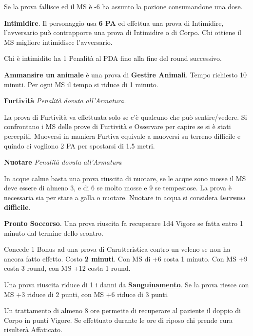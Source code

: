 \documentclass[12pt,a4paper,twoside,openany]{book}
\begin{document}
\begin{multicols}{2}
Se la prova fallisce ed il MS è -6 ha assunto la pozione consumandone una dose.

\medskip

\textbf{Intimidire}. Il personaggio usa \textbf{6 PA} ed effettua una prova di Intimidire, l'avversario può contrapporre una prova di Intimidire o di Corpo. Chi ottiene il MS migliore intimidisce l'avversario.

Chi è intimidito ha 1 Penalità al PDA fino alla fine del round successivo.

\medskip

\textbf{Ammansire un animale} è una prova di \textbf{Gestire Animali}. Tempo richiesto 10 minuti. Per ogni MS il tempo si riduce di 1 minuto.

\medskip

\textbf{Furtività}  \textit{Penalità dovuta all'Armatura.}

La prova di Furtività va effettuata solo se c'è qualcuno che può sentire/vedere. Si confrontano i MS delle prove di Furtività e Osservare per capire se si è stati percepiti. Muoversi in maniera Furtiva equivale a muoversi su terreno difficile e quindo ci vogliono 2 PA per spostarsi di 1.5 metri.

\medskip

\textbf{Nuotare} \textit{Penalità dovuta all'Armatura}

In acque calme basta una prova riuscita di nuotare, se le acque sono mosse il MS deve essere di almeno 3, e di 6 se molto mosse e 9 se tempestose. La prova è necessaria sia per stare a galla o nuotare. Nuotare in acqua si considera \textbf{terreno difficile}.

\medskip

\textbf{Pronto Soccorso}\hypertarget{prontosoccorso}{}\label{prontosoccorso}. Una prova riuscita fa recuperare 1d4 Vigore se fatta entro 1 minuto dal termine dello scontro.

Concede 1 Bonus ad una prova di Caratteristica contro un veleno se non ha ancora fatto effetto. Costo \textbf{2 minuti}. Con MS di +6 costa 1 minuto. Con MS +9 costa 3 round, con MS +12 costa 1 round.

Una prova riuscita riduce di 1 i danni da \hyperlink{sanguinamento}{\textbf{Sanguinamento}}. Se la prova riesce con MS +3 riduce di 2 punti, con MS +6 riduce di 3 punti.

Un trattamento di almeno 8 ore permette di recuperare al paziente il doppio di Corpo in punti Vigore. Se effettuato durante le ore di riposo chi prende cura risulterà Affaticato.


\end{multicols}
\end{document}
